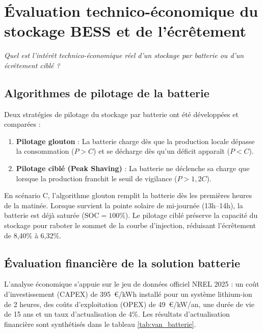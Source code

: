 \documentclass[12pt, a4paper]{report}
\begin{document}
\chapter{Évaluation technico-économique du stockage BESS et de l'écrêtement}

\emph{Quel est l'intérêt technico-économique réel d'un stockage par batterie ou d'un écrêtement ciblé ?}

\section{Algorithmes de pilotage de la batterie}

Deux stratégies de pilotage du stockage par batterie ont été développées et comparées :
\begin{enumerate}
  \item \textbf{Pilotage glouton} : La batterie charge dès que la production locale dépasse la consommation ($P > C$) et se décharge dès qu'un déficit apparaît ($P < C$).
  \item \textbf{Pilotage ciblé (Peak Shaving)} : La batterie ne déclenche sa charge que lorsque la production franchit le seuil de vigilance ($P > 1,2 C$).
\end{enumerate}

En scénario C, l'algorithme glouton remplit la batterie dès les premières heures de la matinée. Lorsque survient la pointe solaire de mi-journée (13h--14h), la batterie est déjà saturée ($\text{SOC} = 100\%$). Le pilotage ciblé préserve la capacité du stockage pour raboter le sommet de la courbe d’injection, réduisant l'écrêtement de 8,40\% à 6,32\%.

\section{Évaluation financière de la solution batterie}

L'analyse économique s'appuie sur le jeu de données officiel NREL 2025 \cite{nrel_storage} : un coût d'investissement (CAPEX) de 395~\euro/kWh installé pour un système lithium-ion de 2 heures, des coûts d'exploitation (OPEX) de 49~\euro/kW/an, une durée de vie de 15 ans et un taux d'actualisation de 4\%. Les résultats d'actualisation financière sont synthétisés dans le tableau \ref{tab:van_batterie}.
\end{document}
